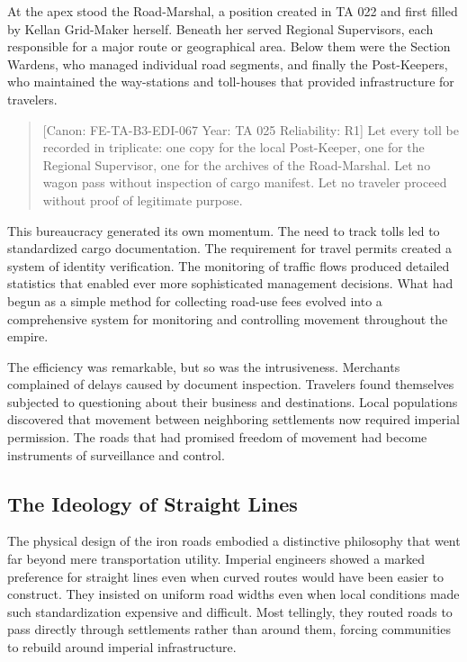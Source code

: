At the apex stood the Road-Marshal, a position created in TA 022 and
first filled by Kellan Grid-Maker herself. Beneath her served Regional
Supervisors, each responsible for a major route or geographical area.
Below them were the Section Wardens, who managed individual road
segments, and finally the Post-Keepers, who maintained the way-stations
and toll-houses that provided infrastructure for travelers.

\begin{quote}
{[}Canon: FE-TA-B3-EDI-067 \textbar{} Year: TA 025 \textbar{}
Reliability: R1{]} Let every toll be recorded in triplicate: one copy
for the local Post-Keeper, one for the Regional Supervisor, one for the
archives of the Road-Marshal. Let no wagon pass without inspection of
cargo manifest. Let no traveler proceed without proof of legitimate
purpose.
\end{quote}

This bureaucracy generated its own momentum. The need to track tolls led
to standardized cargo documentation. The requirement for travel permits
created a system of identity verification. The monitoring of traffic
flows produced detailed statistics that enabled ever more sophisticated
management decisions. What had begun as a simple method for collecting
road-use fees evolved into a comprehensive system for monitoring and
controlling movement throughout the empire.

The efficiency was remarkable, but so was the intrusiveness. Merchants
complained of delays caused by document inspection. Travelers found
themselves subjected to questioning about their business and
destinations. Local populations discovered that movement between
neighboring settlements now required imperial permission. The roads that
had promised freedom of movement had become instruments of surveillance
and control.

\subsection{The Ideology of Straight
Lines}\label{the-ideology-of-straight-lines}

The physical design of the iron roads embodied a distinctive philosophy
that went far beyond mere transportation utility. Imperial engineers
showed a marked preference for straight lines even when curved routes
would have been easier to construct. They insisted on uniform road
widths even when local conditions made such standardization expensive
and difficult. Most tellingly, they routed roads to pass directly
through settlements rather than around them, forcing communities to
rebuild around imperial infrastructure.

